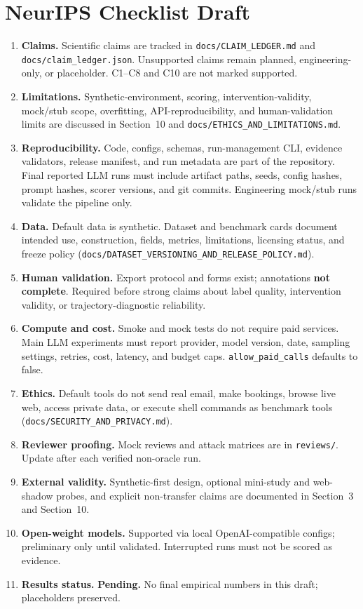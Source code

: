 \section*{NeurIPS Checklist Draft}

\begin{enumerate}[leftmargin=*]
    \item \textbf{Claims.} Scientific claims are tracked in \texttt{docs/CLAIM\_LEDGER.md} and \texttt{docs/claim\_ledger.json}. Unsupported claims remain planned, engineering-only, or placeholder. C1--C8 and C10 are not marked supported.
    \item \textbf{Limitations.} Synthetic-environment, scoring, intervention-validity, mock/stub scope, overfitting, API-reproducibility, and human-validation limits are discussed in Section~10 and \texttt{docs/ETHICS\_AND\_LIMITATIONS.md}.
    \item \textbf{Reproducibility.} Code, configs, schemas, run-management CLI, evidence validators, release manifest, and run metadata are part of the repository. Final reported LLM runs must include artifact paths, seeds, config hashes, prompt hashes, scorer versions, and git commits. Engineering mock/stub runs validate the pipeline only.
    \item \textbf{Data.} Default data is synthetic. Dataset and benchmark cards document intended use, construction, fields, metrics, limitations, licensing status, and freeze policy (\texttt{docs/DATASET\_VERSIONING\_AND\_RELEASE\_POLICY.md}).
    \item \textbf{Human validation.} Export protocol and forms exist; annotations \textbf{not complete}. Required before strong claims about label quality, intervention validity, or trajectory-diagnostic reliability.
    \item \textbf{Compute and cost.} Smoke and mock tests do not require paid services. Main LLM experiments must report provider, model version, date, sampling settings, retries, cost, latency, and budget caps. \texttt{allow\_paid\_calls} defaults to false.
    \item \textbf{Ethics.} Default tools do not send real email, make bookings, browse live web, access private data, or execute shell commands as benchmark tools (\texttt{docs/SECURITY\_AND\_PRIVACY.md}).
    \item \textbf{Reviewer proofing.} Mock reviews and attack matrices are in \texttt{reviews/}. Update after each verified non-oracle run.
    \item \textbf{External validity.} Synthetic-first design, optional mini-study and web-shadow probes, and explicit non-transfer claims are documented in Section~3 and Section~10.
    \item \textbf{Open-weight models.} Supported via local OpenAI-compatible configs; preliminary only until validated. Interrupted runs must not be scored as evidence.
    \item \textbf{Results status.} \textbf{Pending.} No final empirical numbers in this draft; placeholders preserved.
\end{enumerate}
